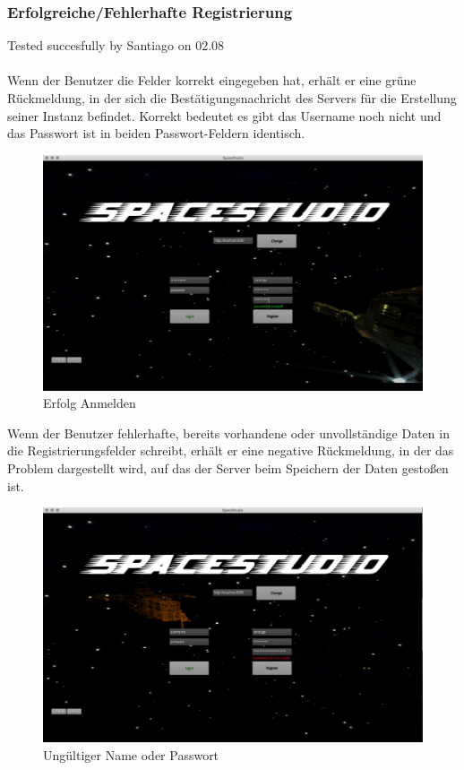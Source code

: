 \documentclass[12pt]{article}
\begin{document}
\newpage
\subsubsection{Erfolgreiche/Fehlerhafte  Registrierung}
Tested succesfully by Santiago on 02.08\\\\
Wenn der Benutzer die Felder korrekt eingegeben hat, erhält er eine grüne Rückmeldung, in der sich die Bestätigungsnachricht des Servers für die Erstellung seiner Instanz befindet. Korrekt bedeutet es gibt das Username noch nicht und das Passwort ist in beiden Passwort-Feldern identisch.\\
\begin{figure}[h]
\centering
\includegraphics[scale=0.4]{TestProtocolBilder/erfolgAnmelden.jpg}
\caption{Erfolg Anmelden}
\end{figure}

Wenn der Benutzer fehlerhafte, bereits vorhandene oder unvollständige Daten in die Registrierungsfelder schreibt, erhält er eine negative Rückmeldung, in der das Problem dargestellt wird, auf das der Server beim Speichern der Daten gestoßen ist.\\
\begin{figure}[h]
\centering
\includegraphics[scale=0.4]{TestProtocolBilder/doesnotMatchPassword.jpg}
\caption{Ungültiger Name oder Passwort}
\end{figure}
\newpage
\end{document}
